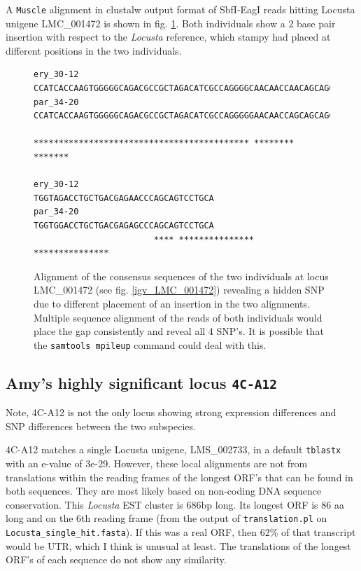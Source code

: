 \documentclass{article}\usepackage[]{graphicx}\usepackage[]{color}
\begin{document}
A \texttt{Muscle} alignment in clustalw output format of SbfI-EagI reads hitting Locusta unigene LMC\_001472 is shown in fig. \ref{muscle_LMC_001472}. Both individuals show a 2 base pair insertion with respect to the \textit{Locusta} reference, which stampy had placed at different positions in the two individuals.

\begin{figure}
\centering
\begin{Verbatim}
ery_30-12               CCATCACCAAGTGGGGGCAGACGCCGCTAGACATCGCCAGGGGCAACAACCAACAGCAGC
par_34-20               CCATCACCAAGTGGGGGCAGACGCCGCTAGACATCGCCAGGGGGAACAACCAGCAGCAGC
                        ******************************************* ******** *******

ery_30-12               TGGTAGACCTGCTGACGAGAACCCAGCAGTCCTGCA
par_34-20               TGGTGGACCTGCTGACGAGAGCCCAGCAGTCCTGCA
                        **** *************** ***************
\end{Verbatim}
\caption{Alignment of the consensus sequences of the two individuals at locus LMC\_001472 (see fig. \ref{igv_LMC_001472}) revealing a hidden SNP due to different placement of an insertion in the two alignments. Multiple sequence alignment of the reads of both individuals would place the gap consistently and reveal all 4 SNP's. It is possible that the \texttt{samtools mpileup} command could deal with this.}
\label{muscle_LMC_001472}
\end{figure}

\subsection{Amy's highly significant locus \texttt{4C-A12}}
\label{4C-A12}
Note, 4C-A12 is not the only locus showing strong expression differences and SNP differences between the two subspecies.

4C-A12 matches a single Locusta unigene, LMS\_002733, in a default \texttt{tblastx} with an e-value of 3e-29. However, these local alignments are not from translations within the reading frames of the longest ORF's that can be found in both sequences. They are most likely based on non-coding DNA sequence conservation. This \textit{Locusta} EST cluster is 686bp long. Its longest ORF is 86 aa long and on the 6th reading frame (from the output of \texttt{translation.pl} on  \texttt{Locusta\_single\_hit.fasta}). If this was a real ORF, then 62\% of that transcript would be UTR, which I think is unusual at least. The translations of the longest ORF's of each sequence do not show any similarity.
\end{document}
